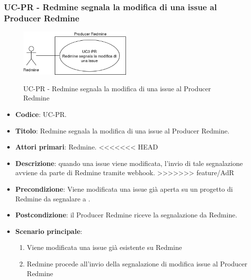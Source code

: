 	\subsubsection{UC\theuccount-PR - Redmine segnala la modifica di una issue al Producer Redmine}
	\begin{figure}[H]
		\centering
		\includegraphics[width=0.5\textwidth]{img/casi_d'uso/UC3.png}\\
		\caption{UC\theuccount-PR - Redmine segnala la modifica di una issue al Producer Redmine}
	\end{figure}
	\begin{itemize}
		\item \textbf{Codice}: UC\theuccount-PR.
		\item \textbf{Titolo}: Redmine segnala la modifica di una issue al Producer Redmine.
		\item \textbf{Attori primari}: Redmine.
<<<<<<< HEAD
		\item \textbf{Descrizione}: quando una issue viene modificata, l'invio di tale segnalazione
			avviene da parte di Redmine tramite webhook.
>>>>>>> feature/AdR
		\item \textbf{Precondizione}: Viene modificata una issue già aperta su un
		progetto di Redmine da segnalare a \progetto.
		\item \textbf{Postcondizione}: il Producer Redmine riceve la segnalazione da Redmine.
		\item \textbf{Scenario principale}: 
		\begin{enumerate}
			\item Viene modificata una issue già esistente su Redmine
			\item Redmine procede all'invio della segnalazione di modifica issue al Producer Redmine
		\end{enumerate}
		
	\end{itemize}